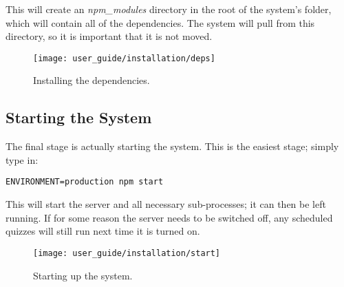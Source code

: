 This will create an \textit{npm\_modules} directory in the root of the system's folder, which will contain all of the dependencies. The system will pull from this directory, so it is important that it is not moved.

\begin{figure}[h!]
  \centering
  \texttt{[image: user\_guide/installation/deps]}
  \caption{Installing the dependencies.}
\end{figure}

\subsection{Starting the System} %
\label{sub:starting_the_system}
The final stage is actually starting the system. This is the easiest stage; simply type in:

\begin{verbatim}ENVIRONMENT=production npm start\end{verbatim}

This will start the server and all necessary sub-processes; it can then be left running. If for some reason the server needs to be switched off, any scheduled quizzes will still run next time it is turned on.

\begin{figure}[h!]
  \centering
  \texttt{[image: user\_guide/installation/start]}
  \caption{Starting up the system.}
\end{figure}

